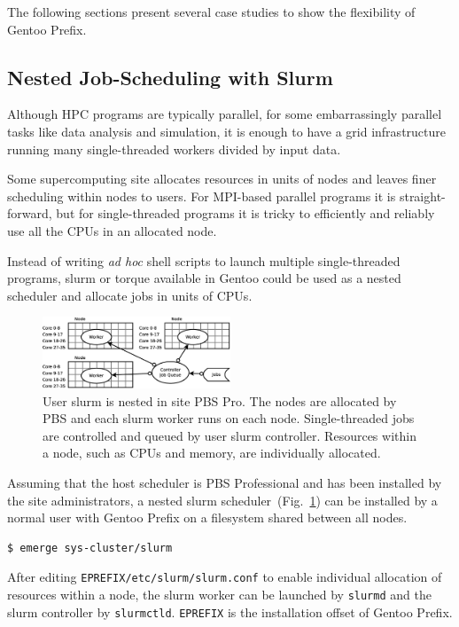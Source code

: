 \documentclass[a4paper,conference]{IEEEtran}
\begin{document}
The following sections present several case studies to show the
flexibility of Gentoo Prefix.

\subsection{Nested Job-Scheduling with Slurm}
\label{sec:slurm}
Although HPC programs are typically parallel, for some embarrassingly
parallel tasks like data analysis and simulation, it is enough to have
a grid infrastructure running many single-threaded workers divided by
input data.

Some supercomputing site allocates resources in units of nodes and
leaves finer scheduling within nodes to users. For MPI-based parallel
programs it is straight-forward, but for single-threaded programs it
is tricky to efficiently and reliably use all the CPUs in an allocated
node.

Instead of writing \textit{ad hoc} shell scripts to launch multiple
single-threaded programs, slurm or torque available in Gentoo could be
used as a nested scheduler and allocate jobs in units of
CPUs.

\begin{figure}[htb]
  \centering
  \includegraphics[width=0.5\textwidth]{node-slurm.eps}
  \caption{User slurm is nested in site PBS Pro. The nodes are
    allocated by PBS and each slurm worker runs on each node.
    Single-threaded jobs are controlled and queued by user slurm
    controller. Resources within a node, such as CPUs and memory, are
    individually allocated.}
  \label{fig:slurm}
\end{figure}

Assuming that the host scheduler is PBS Professional and has been
installed by the site administrators, a nested slurm
scheduler~(Fig.~\ref{fig:slurm}) can be installed by a normal user with
Gentoo Prefix on a filesystem shared between all nodes.
\begin{verbatim} 
$ emerge sys-cluster/slurm 
\end{verbatim}

After editing \texttt{EPREFIX/etc/slurm/slurm.conf} to enable individual
allocation of resources within a node, the slurm worker can be launched by
\texttt{slurmd} and the slurm controller by \texttt{slurmctld}.
\texttt{EPREFIX} is the installation offset of Gentoo Prefix.
\end{document}
